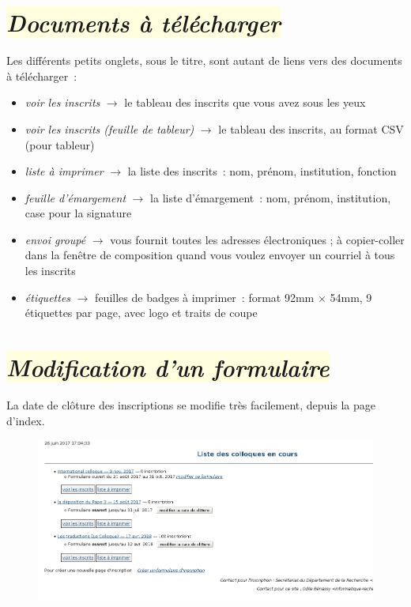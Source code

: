 \documentclass[10pt,a4paper]{article}
\newcommand{\jaunepale}[1]{\colorbox{LightYellow}{#1}}
\begin{document}
\section*{\jaunepale{\emph{Documents à télécharger}}}

Les différents petits onglets, sous le titre, sont autant de liens vers des documents à télécharger :

\begin{itemize}
  \item \emph{voir les inscrits} $\longrightarrow$ le tableau des inscrits que vous avez sous les yeux
  \item \emph{voir les inscrits (feuille de tableur)} $\longrightarrow$ le tableau des inscrits, au format CSV (pour tableur)
  \item \emph{liste à imprimer} $\longrightarrow$ la liste des inscrits : nom, prénom, institution, fonction
  \item \emph{feuille d'émargement} $\longrightarrow$ la liste d'émargement : nom, prénom, institution, case pour la signature
  \item \emph{envoi groupé} $\longrightarrow$ vous fournit toutes les adresses électroniques ; à copier-coller dans la fenêtre de composition quand vous voulez envoyer un courriel à tous les inscrits
  \item \emph{étiquettes} $\longrightarrow$ feuilles de badges à imprimer : format 92mm $\times$ 54mm, 9 étiquettes par page, avec logo et traits de coupe
\end{itemize}

\newpage

\section*{\jaunepale{\emph{Modification d'un formulaire}}}

La date de clôture des inscriptions se modifie très facilement, depuis la page d'index.

\begin{figure}[h]
  \includegraphics[width=500px]{images/suivi-index-2}
 \end{figure}
\end{document}
